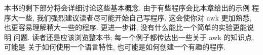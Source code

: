 本书的剩下部分将会详细讨论这些基本概念. 由于有些程序会比本章给出的示例
程序大一些, 我们强烈建议读者尽可能开始自己写程序. 这会使你对 awk 更加熟悉,
也更容易理解稍大一些的程序. 更进一步讲, 没有什么能比一个简单的实验更能说明
问题. 读者还是应该浏览整本书; 每一个例子都传达出一些关于 awk 的知识点, 可能是
关于如何使用一个语言特性, 也可能是如何创建一个有趣的程序.
